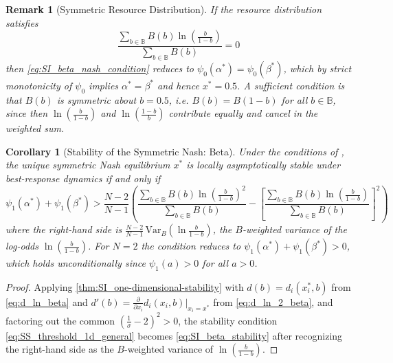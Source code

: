 \documentclass{article}
\newtheorem{corollary}{Corollary}[theorem]
\newtheorem{remark}{Remark}
\begin{document}
            \begin{remark}[Symmetric Resource Distribution]\label{rem:SI_beta_symmetric_nash}
                If the resource distribution satisfies
                \begin{equation}
                    \frac{\sum_{b\in\mathbb{B}} B(b)\ln\!\left(\frac{b}{1-b}\right)}{\sum_{b\in\mathbb{B}} B(b)} = 0
                \end{equation}
                then \cref{eq:SI_beta_nash_condition} reduces to $\psi_0(\alpha^*) = \psi_0(\beta^*)$, which by strict monotonicity of $\psi_0$ implies $\alpha^* = \beta^*$ and hence $x^* = 0.5$. A sufficient condition is that $B(b)$ is symmetric about $b = 0.5$, i.e. $B(b) = B(1-b)$ for all $b \in \mathbb{B}$, since then $\ln\!\left(\frac{b}{1-b}\right)$ and $\ln\!\left(\frac{1-b}{b}\right)$ contribute equally and cancel in the weighted sum.
            \end{remark}

            \begin{corollary}[Stability of the Symmetric Nash: Beta]\label{cor:SI_stability_Beta}
                Under the conditions of , the unique symmetric Nash equilibrium $x^*$ is locally asymptotically stable under best-response dynamics if and only if
                \begin{equation}\label{eq:SI_beta_stability}
                    \psi_1(\alpha^*) + \psi_1(\beta^*) > \frac{N-2}{N-1}\left(\frac{\sum_{b\in\mathbb{B}} B(b)\ln\!\left(\frac{b}{1-b}\right)^2}{\sum_{b\in\mathbb{B}} B(b)} - \left[\frac{\sum_{b\in\mathbb{B}} B(b)\ln\!\left(\frac{b}{1-b}\right)}{\sum_{b\in\mathbb{B}} B(b)}\right]^2\right)
                \end{equation}
                where the right-hand side is $\frac{N-2}{N-1}\,\mathrm{Var}_B\!\left(\ln\frac{b}{1-b}\right)$, the $B$-weighted variance of the log-odds $\ln\!\left(\frac{b}{1-b}\right)$. For $N = 2$ the condition reduces to $\psi_1(\alpha^*) + \psi_1(\beta^*) > 0$, which holds unconditionally since $\psi_1(a) > 0$ for all $a > 0$.
            \end{corollary}
            \begin{proof}
                Applying \cref{thm:SI_one-dimensional-stability} with $d(b) = d_i(x_i^*,b)$ from \cref{eq:d_ln_beta} and $d'(b) = \frac{\partial}{\partial x_i}d_i(x_i,b)|_{x_i=x^*}$ from \cref{eq:d_ln_2_beta}, and factoring out the common $\left(\frac{1}{\sigma}-2\right)^2 > 0$, the stability condition \cref{eq:SS_threshold_1d_general} becomes \cref{eq:SI_beta_stability} after recognizing the right-hand side as the $B$-weighted variance of $\ln\!\left(\frac{b}{1-b}\right)$.
            \end{proof}
\end{document}
